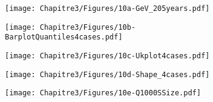         
        \begin{figure}[p]
            \centering
            \begin{subfigure}{0.99\textwidth}
                \centering
                \texttt{[image: Chapitre3/Figures/10a-GeV\_205years.pdf]}
                \caption{}
                \label{subfig:GEV205y}
            \end{subfigure}
            
            \centering
            \begin{subfigure}{0.49\linewidth}
                \centering
                \texttt{[image: Chapitre3/Figures/10b-BarplotQuantiles4cases.pdf]}
                \caption{}
                \label{subfig:BarplotQuantilesGev}
            \end{subfigure}
            \begin{subfigure}{.49\textwidth}
                \centering  
                \texttt{[image: Chapitre3/Figures/10c-Ukplot4cases.pdf]}
                \caption{}
                \label{subfig:UKplot4cases}
            \end{subfigure}
            
            \begin{subfigure}{0.47\textwidth}
                \centering
                \texttt{[image: Chapitre3/Figures/10d-Shape\_4cases.pdf]}
                \caption{}
                \label{subfig:Shape4cases}
            \end{subfigure}
            \begin{subfigure}{0.52\textwidth}
                \centering
                \texttt{[image: Chapitre3/Figures/10e-Q1000SSize.pdf]}
                \caption{}
                \label{subfig:SamplesQ1000}
            \end{subfigure}
            

\end{figure}
